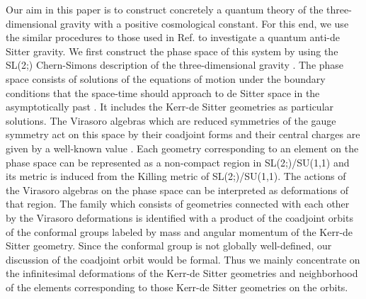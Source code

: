 \documentclass[a4paper,11pt]{article}
\begin{document}
Our aim in this paper is to construct concretely a quantum theory of 
the three-dimensional gravity with a positive cosmological constant.
For this end, 
we use the similar procedures to those used in Ref.\cite{NUY}
to investigate a quantum anti-de Sitter gravity.
We first construct the phase space of this system by using  
the SL(2;\coordHE{}) Chern-Simons description of the three-dimensional
gravity \cite{Witten4}.
The phase space consists of solutions of the equations of motion
under the boundary conditions that the space-time should 
approach to de Sitter space in the asymptotically past \cite{Strominger}. 
It includes the Kerr-de Sitter geometries \cite{Deser-Jackiw, Park}
as particular solutions. 
The Virasoro algebras which are reduced symmetries of the gauge symmetry 
act on this space by their coadjoint forms 
and their central charges are given by a well-known value 
\coordHE{}.
Each geometry corresponding to an element on the phase space 
can be represented as a non-compact region in SL(2;\coordHE{})/SU(1,1) 
and its metric is induced from the Killing metric of 
SL(2;\coordHE{})/SU(1,1).
The actions of the Virasoro algebras on the phase space can be 
interpreted as deformations of that region.
The family which consists of geometries connected with each other 
by the Virasoro deformations is identified with a product of 
the coadjoint orbits of the conformal groups labeled by mass and 
angular momentum of the Kerr-de Sitter geometry.
Since the conformal group is not globally well-defined, 
our discussion of the coadjoint orbit would be formal.
Thus we mainly concentrate on the infinitesimal deformations of 
the Kerr-de Sitter geometries and neighborhood of the elements 
corresponding to those Kerr-de Sitter geometries on the orbits.
\end{document}
